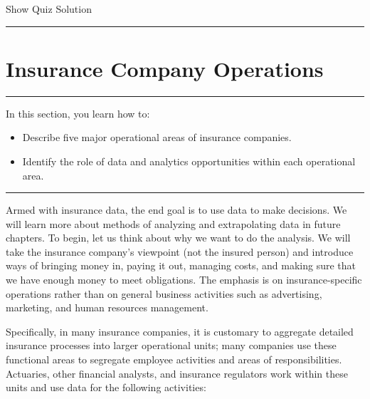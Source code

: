 \documentclass[]{book}
\providecommand{\tightlist}{%
  \setlength{\itemsep}{0pt}\setlength{\parskip}{0pt}}
\theoremstyle{definition}
\theoremstyle{definition}
\theoremstyle{definition}
\theoremstyle{remark}
\begin{document}
Show Quiz Solution

\hypertarget{display.Quiz11.2}{}
\begin{center}\rule{0.5\linewidth}{\linethickness}\end{center}

\section{Insurance Company Operations}\label{S:PredModApps}

\begin{center}\rule{0.5\linewidth}{\linethickness}\end{center}

In this section, you learn how to:

\begin{itemize}
\tightlist
\item
  Describe five major operational areas of insurance companies.
\item
  Identify the role of data and analytics opportunities within each
  operational area.
\end{itemize}

\begin{center}\rule{0.5\linewidth}{\linethickness}\end{center}

Armed with insurance data, the end goal is to use data to make
decisions. We will learn more about methods of analyzing and
extrapolating data in future chapters. To begin, let us think about why
we want to do the analysis. We will take the insurance company's
viewpoint (not the insured person) and introduce ways of bringing money
in, paying it out, managing costs, and making sure that we have enough
money to meet obligations. The emphasis is on insurance-specific
operations rather than on general business activities such as
advertising, marketing, and human resources management.

Specifically, in many insurance companies, it is customary to aggregate
detailed insurance processes into larger operational units; many
companies use these functional areas to segregate employee activities
and areas of responsibilities. Actuaries, other financial analysts, and
insurance regulators work within these units and use data for the
following activities:
\end{document}

